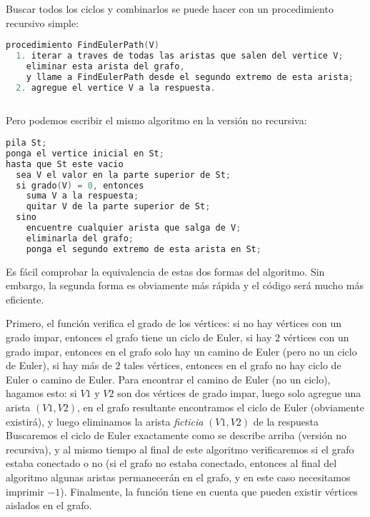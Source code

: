 Buscar todos los ciclos y combinarlos se puede hacer con un procedimiento recursivo simple:

\begin{lstlisting}[language=C++]
procedimiento FindEulerPath(V)
  1. iterar a traves de todas las aristas que salen del vertice V;
	eliminar esta arista del grafo,
	y llame a FindEulerPath desde el segundo extremo de esta arista;
  2. agregue el vertice V a la respuesta.
	
\end{lstlisting}

Pero podemos escribir el mismo algoritmo en la versión no recursiva:

\begin{lstlisting}[language=C++]
pila St;
ponga el vertice inicial en St;
hasta que St este vacio
  sea V el valor en la parte superior de St;
  si grado(V) = 0, entonces
    suma V a la respuesta;
    quitar V de la parte superior de St;
  sino
    encuentre cualquier arista que salga de V;
    eliminarla del grafo;
    ponga el segundo extremo de esta arista en St;
\end{lstlisting}

Es fácil comprobar la equivalencia de estas dos formas del algoritmo. Sin embargo, la segunda forma es obviamente más rápida y el código será mucho más eficiente.

Primero, el función verifica el grado de los vértices: si no hay vértices con un grado impar, entonces 
el grafo tiene un ciclo de Euler, si hay $2$ vértices con un grado impar, entonces en el grafo solo hay 
un camino de Euler (pero no un ciclo de Euler), si hay más de $2$ tales vértices, entonces en el grafo 
no hay ciclo de Euler o camino de Euler. Para encontrar el camino de Euler (no un ciclo), hagamos esto: 
si $V1$ y $V2$ son dos vértices de grado impar, luego solo agregue una arista $(V1,V2)$, en el grafo 
resultante encontramos el ciclo de Euler (obviamente existirá), y luego eliminamos la arista 
\emph{ficticia} $(V1, V2)$ de la respuesta Buscaremos el ciclo de Euler exactamente como se describe 
arriba (versión no recursiva), y al mismo tiempo al final de este algoritmo verificaremos si el grafo 
estaba conectado o no (si el grafo no estaba conectado, entonces al final del algoritmo algunas aristas 
permanecerán en el grafo, y en este caso necesitamos imprimir $-1$). Finalmente, la función tiene en 
cuenta que pueden existir vértices aislados en el grafo.